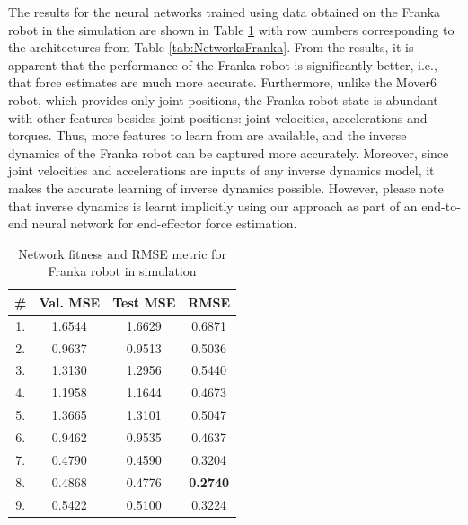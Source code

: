 The results for the neural networks trained using data obtained on the Franka robot in the simulation are shown in  Table \ref{tab:ResultsFranka} with row numbers corresponding to the architectures from Table \ref{tab:NetworksFranka}. From the results, it is apparent that the performance of the Franka robot is significantly better, i.e., that force estimates are much more accurate. Furthermore, unlike the Mover6 robot, which provides only joint positions, the Franka robot state is abundant with other features besides joint positions: joint velocities, accelerations and torques. Thus, more features to learn from are available, and the inverse dynamics of the Franka robot can be captured more accurately. Moreover, since joint velocities and accelerations are inputs of any inverse dynamics model, it makes the accurate learning of inverse dynamics possible. However, please note that inverse dynamics is learnt implicitly using our approach as part of an end-to-end neural network for end-effector force estimation.

\begin{table}
    \caption[Networks performance and RMSE metric for Franka robot (simulation)]{Network fitness and RMSE metric for Franka robot in simulation}
    \label{tab:ResultsFranka}
    \centering
    \begin{tabular}{cccc}
        \toprule
        \textbf{\#} & \textbf{Val. MSE} & \textbf{Test MSE} & \textbf{RMSE} \\
        \midrule
        1. & 1.6544 & 1.6629 & 0.6871\\ %
        2. & 0.9637 & 0.9513 & 0.5036\\ %
        3. & 1.3130 & 1.2956 & 0.5440\\ %
        4. & 1.1958 & 1.1644 & 0.4673\\ %
        5. & 1.3665 & 1.3101 & 0.5047\\ %
        6. & 0.9462 & 0.9535 & 0.4637\\ %
        7. & 0.4790 & 0.4590 & 0.3204\\ %
        8. & 0.4868 & 0.4776 & \textbf{0.2740}\\ %
        9. & 0.5422 & 0.5100 & 0.3224\\ %
        \bottomrule
    \end{tabular}
\end{table}

